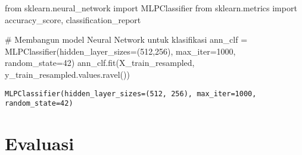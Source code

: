 \documentclass[
  letterpaper,
]{krantz}
\makeatletter
\newenvironment{Shaded}{\begin{snugshade}}{\end{snugshade}}
\newcommand{\CommentTok}[1]{\textcolor[rgb]{0.37,0.37,0.37}{#1}}
\newcommand{\DecValTok}[1]{\textcolor[rgb]{0.68,0.00,0.00}{#1}}
\newcommand{\ImportTok}[1]{\textcolor[rgb]{0.00,0.46,0.62}{#1}}
\newcommand{\NormalTok}[1]{\textcolor[rgb]{0.00,0.23,0.31}{#1}}
\newcommand{\OperatorTok}[1]{\textcolor[rgb]{0.37,0.37,0.37}{#1}}
\newenvironment{kframe}{%
\medskip{}
\setlength{\fboxsep}{.8em}
 \def\at@end@of@kframe{}%
 \ifinner\ifhmode%
  \def\at@end@of@kframe{\end{minipage}}%
  \begin{minipage}{\columnwidth}%
 \fi\fi%
 \def\FrameCommand##1{\hskip\@totalleftmargin \hskip-\fboxsep
 \colorbox{shadecolor}{##1}\hskip-\fboxsep
     \hskip-\linewidth \hskip-\@totalleftmargin \hskip\columnwidth}%
 \MakeFramed {\advance\hsize-\width
   \@totalleftmargin\z@ \linewidth\hsize
   \@setminipage}}%
 {\par\unskip\endMakeFramed%
 \at@end@of@kframe}
\renewenvironment{Shaded}{\begin{kframe}}{\end{kframe}}
\makeatother
\begin{document}
\begin{Shaded}
\begin{Highlighting}[]
\ImportTok{from}\NormalTok{ sklearn.neural\_network }\ImportTok{import}\NormalTok{ MLPClassifier}
\ImportTok{from}\NormalTok{ sklearn.metrics }\ImportTok{import}\NormalTok{ accuracy\_score, classification\_report}

\CommentTok{\# Membangun model Neural Network untuk klasifikasi}
\NormalTok{ann\_clf }\OperatorTok{=}\NormalTok{ MLPClassifier(hidden\_layer\_sizes}\OperatorTok{=}\NormalTok{(}\DecValTok{512}\NormalTok{,}\DecValTok{256}\NormalTok{), max\_iter}\OperatorTok{=}\DecValTok{1000}\NormalTok{, random\_state}\OperatorTok{=}\DecValTok{42}\NormalTok{)}
\NormalTok{ann\_clf.fit(X\_train\_resampled, y\_train\_resampled.values.ravel())}
\end{Highlighting}
\end{Shaded}

\begin{verbatim}
MLPClassifier(hidden_layer_sizes=(512, 256), max_iter=1000, random_state=42)
\end{verbatim}

\hypertarget{evaluasi}{%
\section{Evaluasi}\label{evaluasi}}
\end{document}
